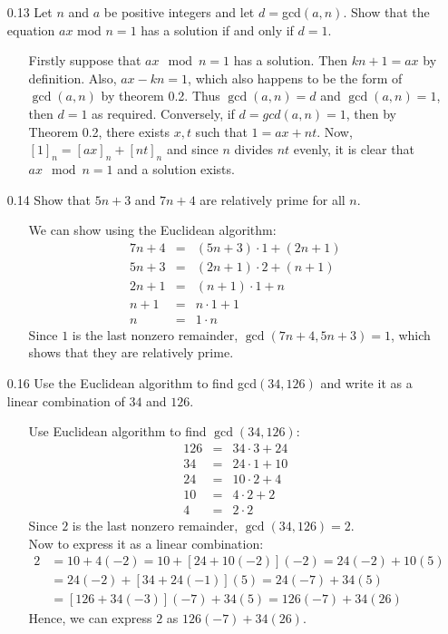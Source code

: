 \documentclass[12pt]{article}
\begin{document}
\begin{enumerate}
\item[0.13] Let $n$ and $a$ be positive integers and let $d = $gcd$(a, n)$. Show that the equation
$ax$ mod $n = 1$ has a solution if and only if $d = 1$.
\begin{enumerate}
\item[] Firstly suppose that $ax\mod n = 1$ has a solution. Then $kn + 1 = ax$ by definition.
Also, $ax - kn = 1$, which also happens to be the form of $\gcd(a, n)$ by theorem 0.2. Thus
$\gcd(a, n) = d$ and $\gcd(a, n) = 1$, then $d = 1$ as required.
Conversely, if $d = gcd(a, n) = 1$, then by Theorem 0.2, there exists $x, t$ such that 
$1 = ax + nt$. Now, $[1]_n = [ax]_n + [nt]_n$ and since $n$ divides $nt$ evenly, 
it is clear that $ax \mod n = 1$ and a solution exists.
\end{enumerate}


\item[0.14] Show that $5n + 3$ and $7n + 4$ are relatively prime for all $n$.
\begin{enumerate}
\item[] We can show using the Euclidean algorithm:
\begin{eqnarray*}
7n + 4 &=& (5n + 3) \cdot 1 + (2n + 1) \\
5n + 3 &=& (2n + 1) \cdot 2 + (n + 1) \\
2n + 1 &=& (n + 1) \cdot 1 + n \\
n + 1 &=& n \cdot 1 + 1 \\
n &=& 1 \cdot n
\end{eqnarray*}
Since $1$ is the last nonzero remainder, $\gcd(7n + 4, 5n + 3) = 1$, which shows that
they are relatively prime.
\end{enumerate}


\item[0.16] Use the Euclidean algorithm to find gcd$(34, 126)$ and write it as a linear combination
of $34$ and $126$.
\begin{enumerate}
\item[] Use Euclidean algorithm to find $\gcd(34, 126)$:
\begin{eqnarray*}
126 &=& 34 \cdot 3 + 24 \\
34 &=& 24 \cdot 1 + 10 \\
24 &=& 10 \cdot 2 + 4 \\
10 &=& 4 \cdot 2 + 2 \\
4 &=& 2 \cdot 2
\end{eqnarray*}
Since $2$ is the last nonzero remainder, $\gcd(34, 126) = 2$. \\
Now to express it as a linear combination:
\begin{align*}
2 &= 10 + 4(-2) = 10 + [24 + 10(-2)](-2) = 24(-2) + 10(5) \\
&= 24(-2) + [34 + 24(-1)](5) = 24(-7) + 34(5) \\
&= [126 + 34(-3)](-7) + 34(5) = 126(-7) + 34(26)
\end{align*}
Hence, we can express $2$ as $126(-7) + 34(26)$.
\end{enumerate}


\end{enumerate}
\end{document}
